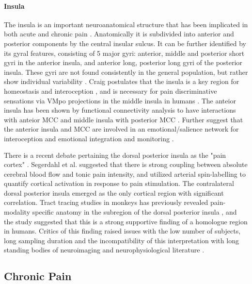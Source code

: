 \paragraph{Insula}

The insula is an important neuroanatomical structure that has been implicated in both acute \cite{Lorenz2005,Starr2009} and chronic pain \cite{May2008,Jensen2016}. Anatomically it is subdivided into anterior and posterior components by the central insular sulcus. It can be further identified by its gyral features, consisting of 5 major gyri: anterior, middle and posterior short gyri in the anterior insula, and anterior long, posterior long gyri of the posterior insula. These gyri are not found consistently in the general population, but rather show individual variability \cite{Rosen2015}. Craig postulates that the insula is a key region for homeostasis and interoception \cite{Craig2003b}, and is necessary for pain discriminative sensations via VMpo projections in the middle insula in humans \cite{Craig2003a}. The anteior insula has been shown by functional connectivity analysis to have interactions with anteior MCC and middle insula with posterior MCC \cite{Taylor2009}. Further suggest that the anterior insula and MCC are involved in an emotional/salience network for interoception and emotional integration and monitoring \cite{Vogt2016}.  

There is a recent debate pertaining the dorsal posterior insula as the "pain cortex" \cite{Segerdahl2015a}. Segerdahl et al. suggested that there is strong coupling between absolute cerebral blood flow and tonic pain intensity, and utilized arterial spin-labelling to quantify cortical activation in response to pain stimulation. The contralateral dorsal posterior insula emerged as the only cortical region with significant correlation. Tract tracing studies in monkeys has previously revealed pain-modality specific anatomy in the subregion of the dorsal posterior insula \cite{Craig2014}, and the study suggested that this is a strong supportive finding of a homologue region in humans. Critics of this finding raised issues with the low number of subjects, long sampling duration and the incompatibility of this interpretation with long standing bodies of neuroimaging and neurophysiological literature \cite{Davis2015}. 

\subsection{Chronic Pain}


